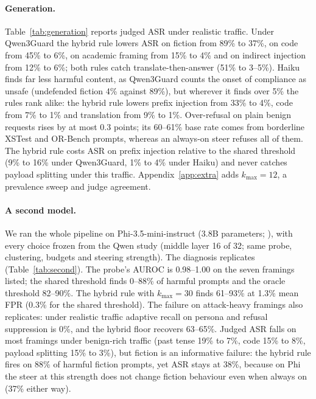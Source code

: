 \documentclass[11pt]{article}
\begin{document}
\paragraph{Generation.}
Table~\ref{tab:generation} reports judged ASR under realistic traffic. Under Qwen3Guard the hybrid rule lowers ASR on fiction from 89\% to 37\%, on code from 45\% to 6\%, on academic framing from 15\% to 4\% and on indirect injection from 12\% to 6\%; both rules catch translate-then-answer (51\% to 3--5\%). Haiku finds far less harmful content, as Qwen3Guard counts the onset of compliance as unsafe (undefended fiction 4\% against 89\%), but wherever it finds over 5\% the rules rank alike: the hybrid rule lowers prefix injection from 33\% to 4\%, code from 7\% to 1\% and translation from 9\% to 1\%. Over-refusal on plain benign requests rises by at most 0.3 points; its 60--61\% base rate comes from borderline XSTest and OR-Bench prompts, whereas an always-on steer refuses all of them. The hybrid rule costs ASR on prefix injection relative to the shared threshold (9\% to 16\% under Qwen3Guard, 1\% to 4\% under Haiku) and never catches payload splitting under this traffic. Appendix~\ref{app:extra} adds $k_{\max}{=}12$, a prevalence sweep and judge agreement.

\paragraph{A second model.}
We ran the whole pipeline on Phi-3.5-mini-instruct (3.8B parameters; \citealp{abdin2024phi3}), with every choice frozen from the Qwen study (middle layer 16 of 32; same probe, clustering, budgets and steering strength). The diagnosis replicates (Table~\ref{tab:second}). The probe's AUROC is 0.98--1.00 on the seven framings listed; the shared threshold finds 0--88\% of harmful prompts and the oracle threshold 82--90\%. The hybrid rule with $k_{\max}{=}30$ finds 61--93\% at 1.3\% mean FPR (0.3\% for the shared threshold). The failure on attack-heavy framings also replicates: under realistic traffic adaptive recall on persona and refusal suppression is 0\%, and the hybrid floor recovers 63--65\%.
Judged ASR falls on most framings under benign-rich traffic (past tense 19\% to 7\%, code 15\% to 8\%, payload splitting 15\% to 3\%), but fiction is an informative failure: the hybrid rule fires on 88\% of harmful fiction prompts, yet ASR stays at 38\%, because on Phi the steer at this strength does not change fiction behaviour even when always on (37\% either way).
\end{document}
